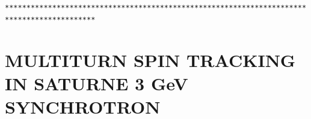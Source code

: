 \begin{center}
\begin{scriptsize}
\begin{alltt}
*******************************************************************************************
\end{alltt}
\end{scriptsize}
\onecolumn

\end{center}

 \clearpage

\section{MULTITURN SPIN TRACKING IN SATURNE 3 GeV SYNCHROTRON}

